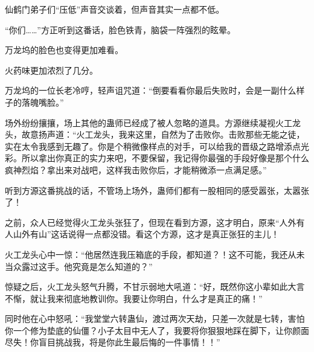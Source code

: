\begin{this_body}
仙鹤门弟子们“压低”声音交谈着，但声音其实一点都不低。

“你们……”方正听到这番话，脸色铁青，脑袋一阵强烈的眩晕。

万龙坞的脸色也变得更加难看。

火药味更加浓烈了几分。

万龙坞的一位长老冷哼，轻声诅咒道：“倒要看看你最后失败时，会是一副什么样子的落魄嘴脸。”

场外纷纷攘攘，场上其他的蛊师已经成了被人忽略的道具。方源继续凝视火工龙头，故意扬声道：“火工龙头，我来这里，自然为了击败你。击败那些无能之徒，实在太令我感到无趣了。你是个稍微像样点的对手，可以给我的晋级之路增添点光彩。所以拿出你真正的实力来吧，不要保留，我记得你最强的手段好像是那个什么疯神烈焰？拿出来对战吧，这样我击败你后，才能稍微添一点满足感。”

听到方源这番挑战的话，不管场上场外，蛊师们都有一股相同的感受嚣张，太嚣张了！

之前，众人已经觉得火工龙头张狂了，但现在看到方源，这才明白，原来“人外有人山外有山”这话说得一点都没错。看这个方源，这才是真正张狂的主儿！

火工龙头心中一惊：“他居然连我压箱底的手段，都知道？！这不可能，我还从未当众露过这手。他究竟是怎么知道的？”

惊疑之后，火工龙头怒气升腾，不甘示弱地大吼道：“好，既然你这小辈如此大言不惭，就让我来彻底地教训你。我要让你明白，什么才是真正的痛！”

同时他在心中怒吼：“我堂堂六转蛊仙，渡过两次天劫，只差一次就是七转，害怕你一个修为垫底的仙僵？小子太目中无人了，我要将你狠狠地踩在脚下，让你颜面尽失！你盲目挑战我，将是你此生最后悔的一件事情！！”

\end{this_body}

